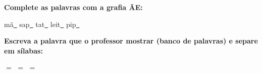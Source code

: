 \noindent\textbf{Complete as palavras com a grafia ÃE:}
\begin{center}
  mã\underline{~} \quad sap\underline{~} \quad tat\underline{~} \quad leit\underline{~} \quad pip\underline{~}
\end{center}

\noindent\textbf{Escreva a palavra que o professor mostrar (banco de palavras) e separe em sílabas:}

\begin{center}
  \underline{\hspace{2cm}} $=$ \underline{\hspace{2cm}} \quad \underline{\hspace{2cm}} $=$ \underline{\hspace{2cm}} \quad \underline{\hspace{2cm}} $=$ \underline{\hspace{2cm}}
  \end{center}



